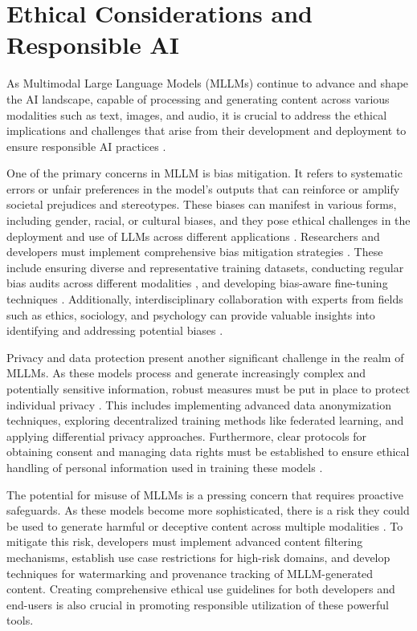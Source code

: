 \chapter{Ethical Considerations and Responsible AI}




As Multimodal Large Language Models (MLLMs) continue to advance and shape the AI landscape, capable of processing and generating content across various modalities such as text, images, and audio, it is crucial to address the ethical implications and challenges that arise from their development and deployment to ensure responsible AI practices \cite{konidena2024ethical}. 

One of the primary concerns in MLLM is bias mitigation. It refers to systematic errors or unfair preferences in the model's outputs that can reinforce or amplify societal prejudices and stereotypes. These biases can manifest in various forms, including gender, racial, or cultural biases, and they pose ethical challenges in the deployment and use of LLMs across different applications \cite{peng2024securing}. Researchers and developers must implement comprehensive bias mitigation strategies \cite{zhang2023mitigating}. These include ensuring diverse and representative training datasets, conducting regular bias \cite{boix2022machine} audits across different modalities \cite{pymetrics2022audit}, and developing bias-aware fine-tuning techniques \cite{kim2024domain}. Additionally, interdisciplinary collaboration with experts from fields such as ethics, sociology, and psychology can provide valuable insights into identifying and addressing potential biases \cite{aquino2023practical}.

Privacy and data protection present another significant challenge in the realm of MLLMs. As these models process and generate increasingly complex and potentially sensitive information, robust measures must be put in place to protect individual privacy \cite{he2024emerged, friha2024llm}. This includes implementing advanced data anonymization techniques, exploring decentralized training methods like federated learning, and applying differential privacy approaches. Furthermore, clear protocols for obtaining consent and managing data rights must be established to ensure ethical handling of personal information used in training these models \cite{mccoy2023ethical}.

The potential for misuse of MLLMs is a pressing concern that requires proactive safeguards. As these models become more sophisticated, there is a risk they could be used to generate harmful or deceptive content across multiple modalities \cite{chen2024trustworthy}. To mitigate this risk, developers must implement advanced content filtering mechanisms, establish use case restrictions for high-risk domains, and develop techniques for watermarking and provenance tracking of MLLM-generated content. Creating comprehensive ethical use guidelines for both developers and end-users is also crucial in promoting responsible utilization of these powerful tools.


